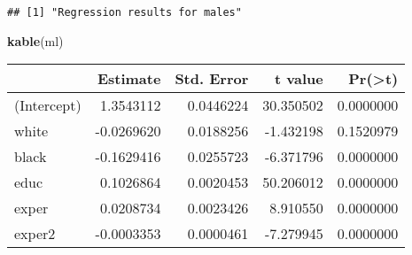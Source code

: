 \documentclass[
]{article}
\newenvironment{Shaded}{\begin{snugshade}}{\end{snugshade}}
\newcommand{\DataTypeTok}[1]{\textcolor[rgb]{0.13,0.29,0.53}{#1}}
\newcommand{\KeywordTok}[1]{\textcolor[rgb]{0.13,0.29,0.53}{\textbf{#1}}}
\newcommand{\NormalTok}[1]{#1}
\newcommand{\OperatorTok}[1]{\textcolor[rgb]{0.81,0.36,0.00}{\textbf{#1}}}
\newcommand{\StringTok}[1]{\textcolor[rgb]{0.31,0.60,0.02}{#1}}
\begin{document}
\begin{Shaded}
\end{Shaded}

\begin{verbatim}
## [1] "Regression results for males"
\end{verbatim}

\begin{Shaded}
\begin{Highlighting}[]
\KeywordTok{kable}\NormalTok{(ml)}
\end{Highlighting}
\end{Shaded}

\begin{longtable}[]{@{}lrrrr@{}}
\toprule
& Estimate & Std. Error & t value &
Pr(\textgreater{}\textbar{}t\textbar{})\tabularnewline
\midrule
\endhead
(Intercept) & 1.3543112 & 0.0446224 & 30.350502 &
0.0000000\tabularnewline
white & -0.0269620 & 0.0188256 & -1.432198 & 0.1520979\tabularnewline
black & -0.1629416 & 0.0255723 & -6.371796 & 0.0000000\tabularnewline
educ & 0.1026864 & 0.0020453 & 50.206012 & 0.0000000\tabularnewline
exper & 0.0208734 & 0.0023426 & 8.910550 & 0.0000000\tabularnewline
exper2 & -0.0003353 & 0.0000461 & -7.279945 & 0.0000000\tabularnewline
\bottomrule
\end{longtable}
\end{document}
